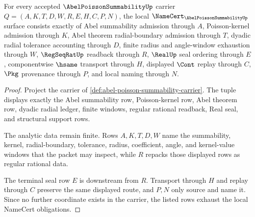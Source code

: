 \begin{theorem}
\label{thm:abel-poisson-summability-namecert-obligations}
For every accepted $\AbelPoissonSummabilityUp$ carrier $Q=(A,K,T,D,W,R,E,H,C,P,N)$, the local $\NameCert_{\AbelPoissonSummabilityUp}$ surface consists exactly of Abel summability admission through $A$, Poisson-kernel admission through $K$, Abel theorem radial-boundary admission through $T$, dyadic radial tolerance accounting through $D$, finite radius and angle-window exhaustion through $W$, $\RegSeqRatUp$ readback through $R$, $\RealUp$ seal ordering through $E$, componentwise $\hsame$ transport through $H$, displayed $\Cont$ replay through $C$, $\Pkg$ provenance through $P$, and local naming through $N$.
\end{theorem}
\begin{proof}
Project the carrier of \autoref{def:abel-poisson-summability-carrier}. The tuple displays exactly the Abel summability row, Poisson-kernel row, Abel theorem row, dyadic radial ledger, finite windows, regular rational readback, Real seal, and structural support rows.

The analytic data remain finite. Rows $A,K,T,D,W$ name the summability, kernel, radial-boundary, tolerance, radius, coefficient, angle, and kernel-value windows that the packet may inspect, while $R$ repacks those displayed rows as regular rational data.

The terminal seal row $E$ is downstream from $R$. Transport through $H$ and replay through $C$ preserve the same displayed route, and $P,N$ only source and name it. Since no further coordinate exists in the carrier, the listed rows exhaust the local NameCert obligations.
\end{proof}

